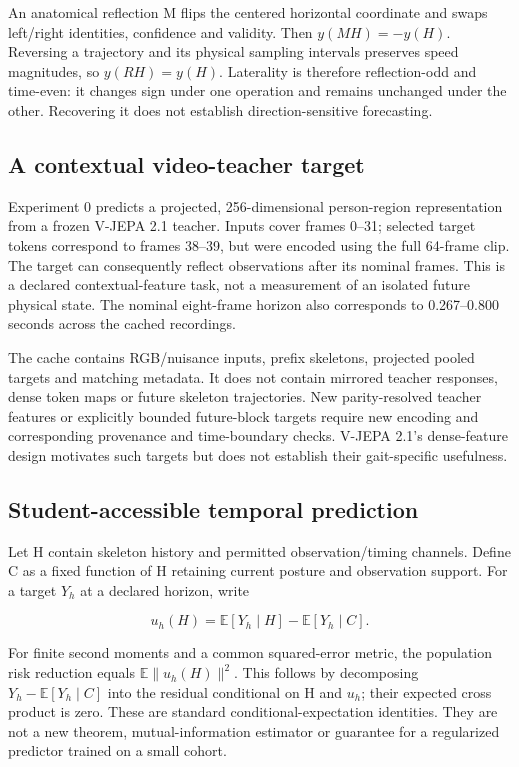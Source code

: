 \documentclass{article}
\begin{document}
An anatomical reflection M flips the centered horizontal coordinate and swaps left/right identities, confidence and validity. Then \(y(MH)=-y(H)\). Reversing a trajectory and its physical sampling intervals preserves speed magnitudes, so \(y(RH)=y(H)\). Laterality is therefore reflection-odd and time-even: it changes sign under one operation and remains unchanged under the other. Recovering it does not establish direction-sensitive forecasting.

\subsection{A contextual video-teacher target}\label{a-contextual-video-teacher-target}

Experiment 0 predicts a projected, 256-dimensional person-region representation from a frozen V-JEPA 2.1 teacher. Inputs cover frames 0--31; selected target tokens correspond to frames 38--39, but were encoded using the full 64-frame clip. The target can consequently reflect observations after its nominal frames. This is a declared contextual-feature task, not a measurement of an isolated future physical state. The nominal eight-frame horizon also corresponds to 0.267--0.800 seconds across the cached recordings.

The cache contains RGB/nuisance inputs, prefix skeletons, projected pooled targets and matching metadata. It does not contain mirrored teacher responses, dense token maps or future skeleton trajectories. New parity-resolved teacher features or explicitly bounded future-block targets require new encoding and corresponding provenance and time-boundary checks. V-JEPA 2.1's dense-feature design \citep{murlabadia2026vjepa21} motivates such targets but does not establish their gait-specific usefulness.

\subsection{Student-accessible temporal prediction}\label{student-accessible-temporal-prediction}

Let H contain skeleton history and permitted observation/timing channels. Define C as a fixed function of H retaining current posture and observation support. For a target \(Y_h\) at a declared horizon, write

\[
u_h(H)=\mathbb{E}[Y_h\mid H]-\mathbb{E}[Y_h\mid C].
\]

For finite second moments and a common squared-error metric, the population risk reduction equals \(\mathbb{E}\|u_h(H)\|^2\). This follows by decomposing \(Y_h-\mathbb{E}[Y_h\mid C]\) into the residual conditional on H and \(u_h\); their expected cross product is zero. These are standard conditional-expectation identities. They are not a new theorem, mutual-information estimator or guarantee for a regularized predictor trained on a small cohort.
\end{document}

